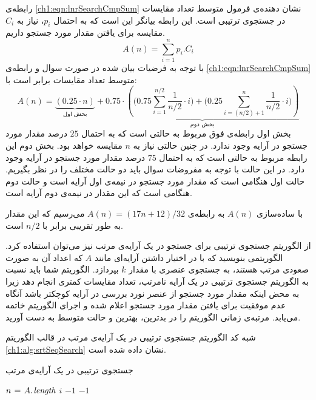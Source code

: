 {

رابطه‌ی {\eqref{ch1:eqn:lnrSearchCmpSum}} نشان دهنده‌ی فرمول متوسط تعداد مقایسات در جستجوی ترتیبی است. این رابطه بیانگر این است که به احتمال {$p_i$}، نیاز به {$C_i$} مقایسه برای یافتن مقدار مورد جستجو داریم.
\begin{equation}
A(n) = \sum_{i=1}^{n}{p_i . C_i}\label{ch1:eqn:lnrSearchCmpSum}
\end{equation}
با توجه به فرضیات بیان شده در صورت سوال و رابطه‌ی {\eqref{ch1:eqn:lnrSearchCmpSum}} متوسط تعداد مقایسات برابر است با:
\begin{displaymath}
A(n) = \underbrace{\left( 0.25\cdot n\right)}_{\text{بخش اول}} +
\underbrace{0.75\cdot\left(\biggl( 0.75\sum_{i=1}^{n/2}{\frac{1}{n/2} \cdot i} \biggr) + \biggl( 0.25\sum_{i=(n/2)+1}^{n}{\frac{1}{n/2}\cdot i} \biggr) \right) }_{\text{بخش دوم}}
\end{displaymath}
بخش اول رابطه‌ی فوق مربوط به حالتی است که به احتمال {$25$} درصد مقدار مورد جستجو در آرایه وجود ندارد. در چنین حالتی نیاز به {$n$} مقایسه خواهد بود. بخش دوم این رابطه مربوط به حالتی است که به احتمال {$75$} درصد مقدار مورد جستجو در آرایه وجود دارد. در این حالت با توجه به مفروضات سوال باید دو حالت مختلف را در نظر بگیریم. حالت اول هنگامی است که مقدار مورد جستجو در نیمه‌ی اول آرایه است و حالت دوم هنگامی است که این مقدار در نیمه‌ی دوم آرایه است.

با ساده‌سازی {$A(n)$} به رابطه‌ی {$A(n)=(17n+12)/32$} می‌رسیم که این مقدار به طور تقریبی برابر با {$n/2$} است.

 از الگوریتم جستجوی ترتیبی برای جستجو در یک آرایه‌ی مرتب نیز می‌توان استفاده کرد. الگوریتمی بنویسید که با در اختیار داشتن آرایه‌ای مانند {$A$}  که اعداد آن به صورت صعودی مرتب هستند، به جستجوی عنصری با مقدار {$k$} بپردازد. الگوریتم شما باید نسبت به الگوریتم جستجوی ترتیبی در یک آرایه نامرتب، تعداد مقایسات کمتری انجام دهد زیرا به محض اینکه مقدار مورد جستجو از عنصر نورد بررسی در آرایه کوچکتر باشد آنگاه عدم موفقیت برای یافتن مقدار مورد جستجو اعلام شده و اجرای الگوریتم خاتمه می‌یابد. مرتبه‌ی زمانی الگوریتم را در بدترین، بهترین و حالت متوسط به دست آورید.


شبه کد الگوریتم جستجوی ترتیبی در یک آرایه‌ی مرتب در قالب الگوریتم {\eqref{ch1:alg:srtSeqSearch}} نشان داده شده است.

\begin{algorithm}
\caption{جستجوی ترتیبی در یک آرایه‌ی مرتب}\label{ch1:alg:srtSeqSearch}
\begin{latin}
\begin{algorithmic}[1]
		\State	$n \mathrel{\hspace{1pt}=\hspace{1pt}} A.\hspace*{1pt}\mathit{length}$
						\State	\Return $i$
						\State	\Return $-1$
				\EndIf
		\EndFor
		\State	\Return	$-1$		
\EndFunction
\end{algorithmic}
\end{latin}
\end{algorithm}

}
